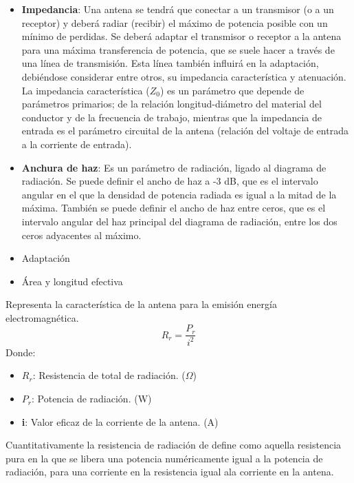 \documentclass[
	12pt, %
	fleqn, %
	a4paper, %
	oneside, %
]{LegrandOrangeBook}
\begin{document}
\begin{itemize}
\item \textbf{Impedancia}: Una antena se tendrá que conectar a un transmisor (o a un receptor) y deberá radiar (recibir) el máximo de potencia posible con un mínimo de perdidas. Se deberá adaptar el transmisor o receptor a la antena para una máxima transferencia de potencia, que se suele hacer a través de una línea de transmisión. Esta línea también influirá en la adaptación, debiéndose considerar entre otros, su impedancia característica y atenuación.\\
La impedancia característica ($Z_0$) es un parámetro que depende de parámetros primarios; de la relación longitud-diámetro del material del conductor y de la frecuencia de trabajo, mientras que la impedancia de entrada es el parámetro circuital de la antena (relación del voltaje de entrada a la corriente de entrada).
\item \textbf{Anchura de haz}:  Es un parámetro de radiación, ligado al diagrama de radiación. Se puede definir el ancho de haz a -3 dB, que es el intervalo angular en el que la densidad de potencia radiada es igual a la mitad de la máxima. También se puede definir el ancho de haz entre ceros, que es el intervalo angular del haz principal del diagrama de radiación, entre los dos ceros adyacentes al máximo.
\item Adaptación
\item Área y longitud efectiva
\end{itemize}
\begin{definition}
Representa la característica de la antena para la emisión energía electromagnética.
\begin{equation}
R_r=\frac{P_r}{i^2}
\label{eq:resistencia radiacion}
\end{equation}
Donde:
\begin{itemize}
\item $R_r$: Resistencia de total de radiación. ($\Omega$)
\item $P_r$: Potencia de radiación. (W)
\item \textbf{i}: Valor eficaz de la corriente de la antena. (A)
\end{itemize}
\end{definition}
Cuantitativamente la resistencia de radiación de define como aquella resistencia pura en la que se libera una potencia numéricamente igual a la potencia de radiación, para una corriente en la resistencia igual ala corriente en la antena.
\end{document}
